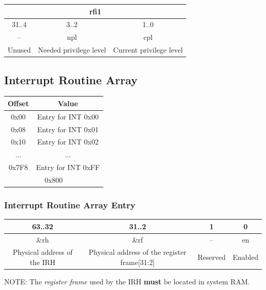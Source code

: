 \documentclass[a4paper,10pt]{article}
\begin{document}
\begin{table}[H]
	\centering
	{
		\begin{tabular}{|c|c|c|}
\hline
\multicolumn{3}{|c|}{rfi1} \\
\hline
31..4 & 3..2 & 1..0 \\
\hline
-- & npl & cpl \\
\hline
Unused & Needed privilege level & Current privilege level \\
\hline
		\end{tabular}
	}
\end{table}

\subsection{Interrupt Routine Array} \label{ir:ARRAY}
\begin{table}[H]
	\centering
	{
		\begin{tabular}{|c|c|}
\hline
Offset & Value \\
\hline
0x00 & Entry for INT 0x00 \\
\hline
0x08 & Entry for INT 0x01 \\
\hline
0x10 & Entry for INT 0x02 \\
\hline
... & ... \\
\hline
0x7F8 & Entry for INT 0xFF \\
\hline
\multicolumn{2}{|c|}{0x800} \\
\hline
		\end{tabular}
	}
\end{table}

\subsubsection{Interrupt Routine Array Entry}
\begin{table}[H]
	\centering
	\resizebox{\linewidth}{!}
	{
		\begin{tabular}{|c|c|c|c|}
\hline
63..32 & 31..2 & 1 & 0 \\
\hline
\&rh & \&rf & -- & en \\
\hline
Physical address of the IRH & Physical address of the register frame[31:2] & Reserved & Enabled \\
\hline
		\end{tabular}
	}
\end{table}

NOTE: The \emph{register frame} used by the IRH \textbf{must} be located in system RAM.\\
\end{document}
